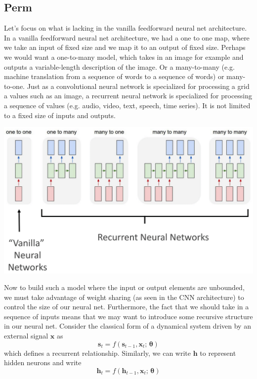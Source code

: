 \documentclass{article}
\theoremstyle{definition}
\theoremstyle{remark}
\theoremstyle{definition}
\begin{document}
\subsection{Perm}

Let's focus on what is lacking in the vanilla feedforward neural net architecture. In a vanilla feedforward neural net architecture, we had a one to one map, where we take an input of fixed size and we map it to an output of fixed size. Perhaps we would want a one-to-many model, which takes in an image for example and outputs a variable-length description of the image. Or a many-to-many (e.g. machine translation from a sequence of words to a sequence of words) or many-to-one. Just as a convolutional neural network is specialized for processing a grid a values such as an image, a recurrent neural network is specialized for processing a sequence of values (e.g. audio, video, text, speech, time series). It is not limited to a fixed size of inputs and outputs. 
\begin{center}
    \includegraphics[scale=0.25]{img/RNNs/NNs_vs_RNN.png}
\end{center}
Now to build such a model where the input or output elements are unbounded, we must take advantage of weight sharing (as seen in the CNN architecture) to control the size of our neural net. Furthermore, the fact that we should take in a sequence of inputs means that we may want to introduce some recursive structure in our neural net. Consider the classical form of a dynamical system driven by an external signal $\mathbf{x}$ as 
\[\mathbf{s}_t = f(\mathbf{s}_{t-1}, \mathbf{x}_t; \, \boldsymbol{\theta} )\]
which defines a recurrent relationship. Similarly, we can write $\mathbf{h}$ to represent hidden neurons and write 
\[\mathbf{h}_t = f(\mathbf{h}_{t-1}, \mathbf{x}_t; \, \boldsymbol{\theta} )\]
\end{document}
